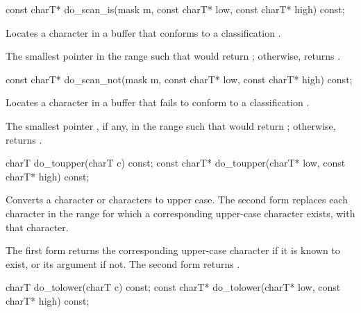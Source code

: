 %
\begin{itemdecl}
const charT* do_scan_is(mask m,
                       const charT* low, const charT* high) const;
\end{itemdecl}

\begin{itemdescr}
\pnum
\effects
Locates a character in a buffer that conforms to a classification
.

\pnum
\returns
The smallest pointer  in the range
such that
would return
;
otherwise, returns .
\end{itemdescr}

%
\begin{itemdecl}
const charT* do_scan_not(mask m,
                        const charT* low, const charT* high) const;
\end{itemdecl}

\begin{itemdescr}
\pnum
\effects
Locates a character in a buffer that fails to conform to a classification
.

\pnum
\returns
The smallest pointer , if any, in the range
such that
would return
;
otherwise, returns .
\end{itemdescr}

%
\begin{itemdecl}
charT        do_toupper(charT c) const;
const charT* do_toupper(charT* low, const charT* high) const;
\end{itemdecl}

\begin{itemdescr}
\pnum
\effects
Converts a character or characters to upper case.
The second form replaces each character
in the range
for which a corresponding upper-case character exists, with
that character.

\pnum
\returns
The first form returns the corresponding upper-case character if it
is known to exist, or its argument if not.
The second form returns .
\end{itemdescr}

%
\begin{itemdecl}
charT        do_tolower(charT c) const;
const charT* do_tolower(charT* low, const charT* high) const;
\end{itemdecl}

